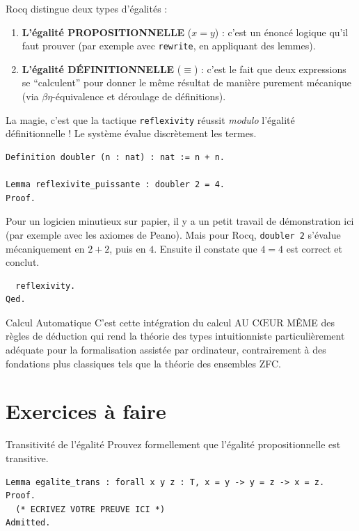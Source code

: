 \documentclass[11pt,a4paper]{article}
\begin{document}
Rocq distingue deux types d'égalités :
\begin{enumerate}
  \item \textbf{L'égalité PROPOSITIONNELLE} ($x = y$) : c'est un énoncé logique qu'il faut prouver (par exemple avec \texttt{rewrite}, en appliquant des lemmes).
  \item \textbf{L'égalité DÉFINITIONNELLE} ($\equiv$) : c'est le fait que deux expressions se ``calculent'' pour donner le même résultat de manière purement mécanique (via $\beta\eta$-équivalence et déroulage de définitions).
\end{enumerate}

La magie, c'est que la tactique \texttt{reflexivity} réussit \textit{modulo} l'égalité définitionnelle ! Le système évalue discrètement les termes.

\begin{lstlisting}
Definition doubler (n : nat) : nat := n + n.

Lemma reflexivite_puissante : doubler 2 = 4.
Proof.
\end{lstlisting}

Pour un logicien minutieux sur papier, il y a un petit travail de démonstration ici (par exemple avec les axiomes de Peano). Mais pour Rocq, \texttt{doubler 2} s'évalue mécaniquement en $2 + 2$, puis en $4$. Ensuite il constate que $4 = 4$ est correct et conclut.

\begin{lstlisting}
  reflexivity.
Qed.
\end{lstlisting}

\begin{remarque}{Calcul Automatique}{}
  C'est cette intégration du calcul AU CŒUR MÊME des règles de déduction qui rend la théorie des types intuitionniste particulièrement adéquate pour la formalisation assistée par ordinateur, contrairement à des fondations plus classiques tels que la théorie des ensembles ZFC.
\end{remarque}

\section{Exercices à faire}

\begin{exercice}{Transitivité de l'égalité}{}
  Prouvez formellement que l'égalité propositionnelle est transitive.

\begin{lstlisting}
Lemma egalite_trans : forall x y z : T, x = y -> y = z -> x = z.
Proof.
  (* ECRIVEZ VOTRE PREUVE ICI *)
Admitted.
\end{lstlisting}
\end{exercice}
\end{document}
